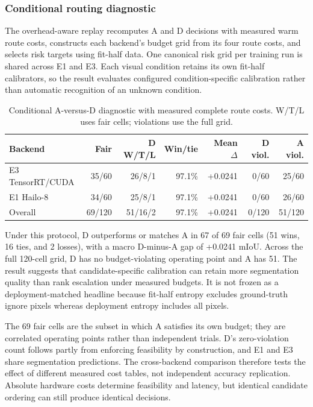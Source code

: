\documentclass[a4paper,review,12pt]{elsarticle}
\newcommand{\miou}{mIoU}
\begin{document}
\subsubsection{Conditional routing diagnostic}

The overhead-aware replay recomputes A and D decisions with measured warm route costs, constructs each backend's budget grid from its four route costs, and selects risk targets using fit-half data. One canonical risk grid per training run is shared across E1 and E3. Each visual condition retains its own fit-half calibrators, so the result evaluates configured condition-specific calibration rather than automatic recognition of an unknown condition.

\begin{table}[H]
\centering
\caption{Conditional A-versus-D diagnostic with measured complete route costs. W/T/L uses fair cells; violations use the full grid.}
\label{tab:routerfinal}
\footnotesize
\setlength{\tabcolsep}{3.5pt}
\begin{tabular}{@{}lrrrrrr@{}}
\toprule
Backend & Fair & D W/T/L & Win/tie & Mean $\Delta$ & D viol. & A viol. \\
\midrule
E3 TensorRT/CUDA & 35/60 & 26/8/1 & 97.1\% & +0.0241 & 0/60 & 25/60 \\
E1 Hailo-8 & 34/60 & 25/8/1 & 97.1\% & +0.0241 & 0/60 & 26/60 \\
Overall & 69/120 & 51/16/2 & 97.1\% & +0.0241 & 0/120 & 51/120 \\
\bottomrule
\end{tabular}
\end{table}

Under this protocol, D outperforms or matches A in 67 of 69 fair cells (51 wins, 16 ties, and 2 losses), with a macro D-minus-A gap of +0.0241 \miou{}. Across the full 120-cell grid, D has no budget-violating operating point and A has 51. The result suggests that candidate-specific calibration can retain more segmentation quality than rank escalation under measured budgets. It is not frozen as a deployment-matched headline because fit-half entropy excludes ground-truth ignore pixels whereas deployment entropy includes all pixels.

The 69 fair cells are the subset in which A satisfies its own budget; they are correlated operating points rather than independent trials. D's zero-violation count follows partly from enforcing feasibility by construction, and E1 and E3 share segmentation predictions. The cross-backend comparison therefore tests the effect of different measured cost tables, not independent accuracy replication. Absolute hardware costs determine feasibility and latency, but identical candidate ordering can still produce identical decisions.
\end{document}

